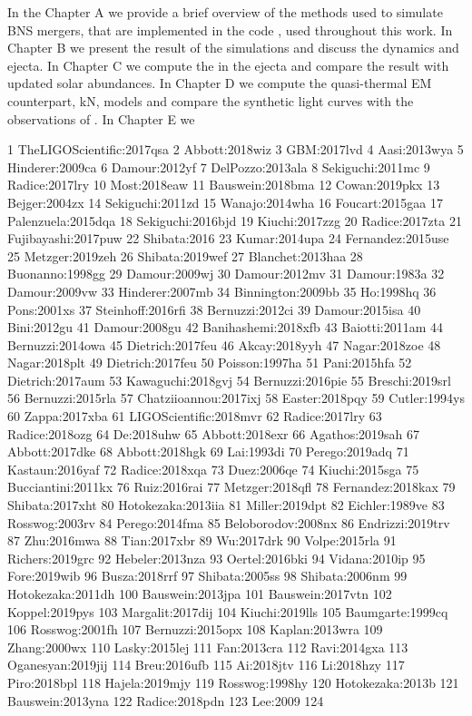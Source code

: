In the Chapter A we provide a brief overview of the methods used to simulate \ac{BNS} mergers, 
that are implemented in the code \wisky{}, used throughout this work.
In Chapter B we present the result of the simulations and discuss the dynamics and ejecta.
In Chapter C we compute the \rproc{} \nuc{} in the ejecta and compare the result with updated 
solar abundances.
In Chapter D we compute the quasi-thermal \ac{EM} counterpart, \ac{kN}, models and compare 
the synthetic light curves with the observations of \AT{}.
In Chapter E we 



1 TheLIGOScientific:2017qsa
2 Abbott:2018wiz
3 GBM:2017lvd
4 Aasi:2013wya
5 Hinderer:2009ca
6 Damour:2012yf
7 DelPozzo:2013ala
8 Sekiguchi:2011mc
9 Radice:2017lry
10 Most:2018eaw
11 Bauswein:2018bma
12 Cowan:2019pkx
13 Bejger:2004zx 
14 Sekiguchi:2011zd
15 Wanajo:2014wha
16 Foucart:2015gaa
17 Palenzuela:2015dqa
18 Sekiguchi:2016bjd
19 Kiuchi:2017zzg
20 Radice:2017zta
21 Fujibayashi:2017puw
22 Shibata:2016
23 Kumar:2014upa
24 Fernandez:2015use
25 Metzger:2019zeh
26 Shibata:2019wef
27 Blanchet:2013haa
28 Buonanno:1998gg
29 Damour:2009wj
30 Damour:2012mv
31 Damour:1983a
32 Damour:2009vw
33 Hinderer:2007mb
34 Binnington:2009bb
35 Ho:1998hq
36 Pons:2001xs
37 Steinhoff:2016rfi
38 Bernuzzi:2012ci
39 Damour:2015isa
40 Bini:2012gu
41 Damour:2008gu
42 Banihashemi:2018xfb
43 Baiotti:2011am
44 Bernuzzi:2014owa
45 Dietrich:2017feu
46 Akcay:2018yyh
47 Nagar:2018zoe
48 Nagar:2018plt
49 Dietrich:2017feu
50 Poisson:1997ha
51 Pani:2015hfa
52 Dietrich:2017aum
53 Kawaguchi:2018gvj
54 Bernuzzi:2016pie
55 Breschi:2019srl
56 Bernuzzi:2015rla
57 Chatziioannou:2017ixj
58 Easter:2018pqy
59 Cutler:1994ys
60 Zappa:2017xba
61 LIGOScientific:2018mvr
62 Radice:2017lry
63 Radice:2018ozg
64 De:2018uhw
65 Abbott:2018exr
66 Agathos:2019sah
67 Abbott:2017dke
68 Abbott:2018hgk
69 Lai:1993di
70 Perego:2019adq
71 Kastaun:2016yaf
72 Radice:2018xqa
73 Duez:2006qe
74 Kiuchi:2015sga
75 Bucciantini:2011kx
76 Ruiz:2016rai
77 Metzger:2018qfl
78 Fernandez:2018kax
79 Shibata:2017xht
80 Hotokezaka:2013iia
81 Miller:2019dpt
82 Eichler:1989ve
83 Rosswog:2003rv
84 Perego:2014fma
85 Beloborodov:2008nx
86 Endrizzi:2019trv
87 Zhu:2016mwa
88 Tian:2017xbr
89 Wu:2017drk
90 Volpe:2015rla
91 Richers:2019grc
92 Hebeler:2013nza
93 Oertel:2016bki
94 Vidana:2010ip
95 Fore:2019wib
96 Busza:2018rrf
97 Shibata:2005ss
98 Shibata:2006nm
99 Hotokezaka:2011dh
100 Bauswein:2013jpa
101 Bauswein:2017vtn
102 Koppel:2019pys
103 Margalit:2017dij
104 Kiuchi:2019lls
105 Baumgarte:1999cq
106 Rosswog:2001fh
107 Bernuzzi:2015opx
108 Kaplan:2013wra
109 Zhang:2000wx
110 Lasky:2015lej
111 Fan:2013cra
112 Ravi:2014gxa
113 Oganesyan:2019jij
114 Breu:2016ufb
115 Ai:2018jtv
116 Li:2018hzy
117 Piro:2018bpl
118 Hajela:2019mjy
119 Rosswog:1998hy
120 Hotokezaka:2013b
121 Bauswein:2013yna
122 Radice:2018pdn
123 Lee:2009
124 
